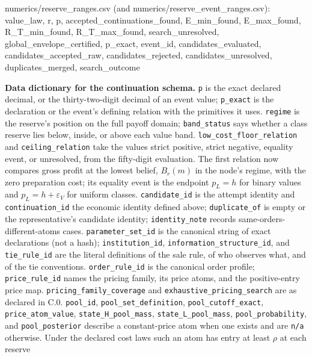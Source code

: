 \documentclass[
  11pt,
]{article}
\newenvironment{Shaded}{}{}
\newcommand{\NormalTok}[1]{#1}
\begin{document}
\begin{Shaded}
\begin{Highlighting}[]
\NormalTok{numerics/reserve\_ranges.csv (and numerics/reserve\_event\_ranges.csv):}
\NormalTok{value\_law, r, p, accepted\_continuations\_found,}
\NormalTok{E\_min\_found, E\_max\_found, R\_T\_min\_found, R\_T\_max\_found,}
\NormalTok{search\_unresolved, global\_envelope\_certified,}
\NormalTok{p\_exact, event\_id, candidates\_evaluated, candidates\_accepted\_raw,}
\NormalTok{candidates\_rejected, candidates\_unresolved, duplicates\_merged, search\_outcome}
\end{Highlighting}
\end{Shaded}

\textbf{Data dictionary for the continuation schema.} \texttt{p} is the
exact declared decimal, or the thirty-two-digit decimal of an event
value; \texttt{p\_exact} is the declaration or the event's defining
relation with the primitives it uses. \texttt{regime} is the reserve's
position on the full payoff domain; \texttt{band\_status} says whether a
class reserve lies below, inside, or above each value band.
\texttt{low\_cost\_floor\_relation} and \texttt{ceiling\_relation} take
the values strict positive, strict negative, equality event, or
unresolved, from the fifty-digit evaluation. The first relation now compares
gross profit at the lowest belief, \(B_r(m)\) in the node's regime, with the
zero preparation cost; its equality event is the endpoint \(p_L=h\) for
binary values and \(p_L=h+\varepsilon_V\) for uniform classes. \texttt{candidate\_id} is
the attempt identity and \texttt{continuation\_id} the economic identity
defined above; \texttt{duplicate\_of} is empty or the representative's
candidate identity; \texttt{identity\_note} records
same-orders-different-atoms cases. \texttt{parameter\_set\_id} is the
canonical string of exact declarations (not a hash);
\texttt{institution\_id}, \texttt{information\_structure\_id}, and
\texttt{tie\_rule\_id} are the literal definitions of the sale rule, of
who observes what, and of the tie conventions. \texttt{order\_rule\_id}
is the canonical order profile; \texttt{price\_rule\_id} names the
pricing family, its price atoms, and the positive-entry price map.
\texttt{pricing\_family\_coverage} and
\texttt{exhaustive\_pricing\_search} are as declared in C.0.
\texttt{pool\_id}, \texttt{pool\_set\_definition},
\texttt{pool\_cutoff\_exact}, \texttt{price\_atom\_value},
\texttt{state\_H\_pool\_mass}, \texttt{state\_L\_pool\_mass},
\texttt{pool\_probability}, and \texttt{pool\_posterior} describe a
constant-price atom when one exists and are \texttt{n/a} otherwise. Under the
declared cost laws such an atom has entry at least \(\rho\) at each reserve
\end{document}
